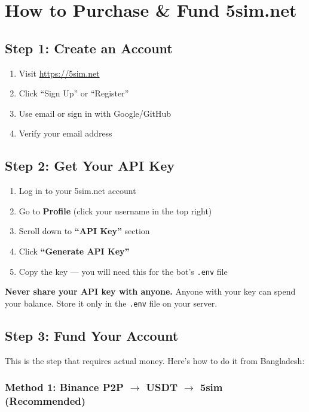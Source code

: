\section{How to Purchase \& Fund 5sim.net}

\subsection{Step 1: Create an Account}

\begin{enumerate}
    \item Visit \href{https://5sim.net}{https://5sim.net}
    \item Click ``Sign Up'' or ``Register''
    \item Use email or sign in with Google/GitHub
    \item Verify your email address
\end{enumerate}

\subsection{Step 2: Get Your API Key}

\begin{enumerate}
    \item Log in to your 5sim.net account
    \item Go to \textbf{Profile} (click your username in the top right)
    \item Scroll down to \textbf{``API Key''} section
    \item Click \textbf{``Generate API Key''}
    \item Copy the key --- you will need this for the bot's \texttt{.env} file
\end{enumerate}

\begin{importantbox}
\textbf{Never share your API key with anyone.} Anyone with your key can spend your balance. Store it only in the \texttt{.env} file on your server.
\end{importantbox}

\subsection{Step 3: Fund Your Account}

This is the step that requires actual money. Here's how to do it from Bangladesh:

\subsubsection{Method 1: Binance P2P $\rightarrow$ USDT $\rightarrow$ 5sim (Recommended)}

